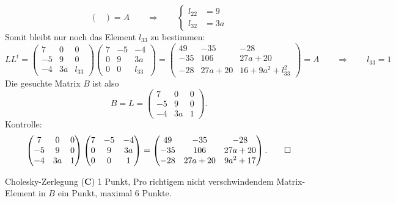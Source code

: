 \begin{loesung}
\[\begin{pmatrix}
\end{pmatrix}
=
A
\qquad\Rightarrow\qquad
\left\{
\begin{aligned}
l_{22}&=9\\
l_{32}&=3a
\end{aligned}
\right.
\]
Somit bleibt nur noch das Element $l_{33}$ zu bestimmen:
\[
LL^t=
\begin{pmatrix}
7&     0&0\\
-5&9&0\\
-4&3a&l_{33}
\end{pmatrix}
\begin{pmatrix}
7&    -5&    -4\\
0&9&3a\\
0&     0&l_{33}
\end{pmatrix}
=
\begin{pmatrix}
49&-35 & -28\\
-35&106 &27a+20\\
-28&27a+20&  16+9a^2+l_{33}^2
\end{pmatrix}
=
A
\qquad\Rightarrow\qquad
l_{33}=1
\]
Die gesuchte Matrix $B$ ist also
\[
B = L=
\begin{pmatrix}
7&     0&0\\
-5&9&0\\
-4&3a&1
\end{pmatrix}.
\]
Kontrolle:
\[
\begin{pmatrix}
7&     0&0\\
-5&9&0\\
-4&3a&1
\end{pmatrix}
\begin{pmatrix}
7&  -5& -4\\
0&9&3a\\
0& 0&1
\end{pmatrix}
=
\begin{pmatrix}
49& -35&-28\\
-35&106&27a + 20\\
-28&27a + 20&9a^2 + 17
\end{pmatrix}.
\qedhere
\]
\end{loesung}

\begin{bewertung}
Cholesky-Zerlegung ({\bf C}) 1 Punkt,
Pro richtigem nicht verschwindendem Matrix-Element in $B$ ein Punkt,
maximal 6 Punkte.
\end{bewertung}

